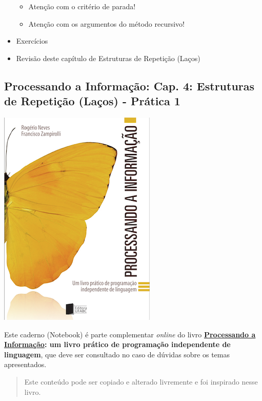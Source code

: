 \documentclass[12pt,a4paper]{article}
\providecommand{\tightlist}{%
      \setlength{\itemsep}{0pt}\setlength{\parskip}{0pt}}
\begin{document}
\begin{itemize}
  \begin{itemize}
  \tightlist
  \item
    Atenção com o critério de parada!
  \item
    Atenção com os argumentos do método recursivo!
  \end{itemize}
\item
  Exercícios
\item
  Revisão deste capítulo de Estruturas de Repetição (Laços)
\end{itemize}

    \hypertarget{processando-a-informauxe7uxe3o-cap.-4-estruturas-de-repetiuxe7uxe3o-lauxe7os---pruxe1tica-1}{%
\subsection{Processando a Informação: Cap. 4: Estruturas de Repetição
(Laços) - Prática
1}\label{processando-a-informauxe7uxe3o-cap.-4-estruturas-de-repetiuxe7uxe3o-lauxe7os---pruxe1tica-1}}

    \includegraphics{"figs/Capa_Processando_Informacao.jpg"}

Este caderno (Notebook) é parte complementar \emph{online} do livro
\textbf{\href{https://editora.ufabc.edu.br/matematica-e-ciencias-da-computacao/58-processando-a-informacao}{Processando
a Informação}: um livro prático de programação independente de
linguagem}, que deve ser consultado no caso de dúvidas sobre os temas
apresentados.

\begin{quote}
Este conteúdo pode ser copiado e alterado livremente e foi inspirado
nesse livro.
\end{quote}
\end{document}
